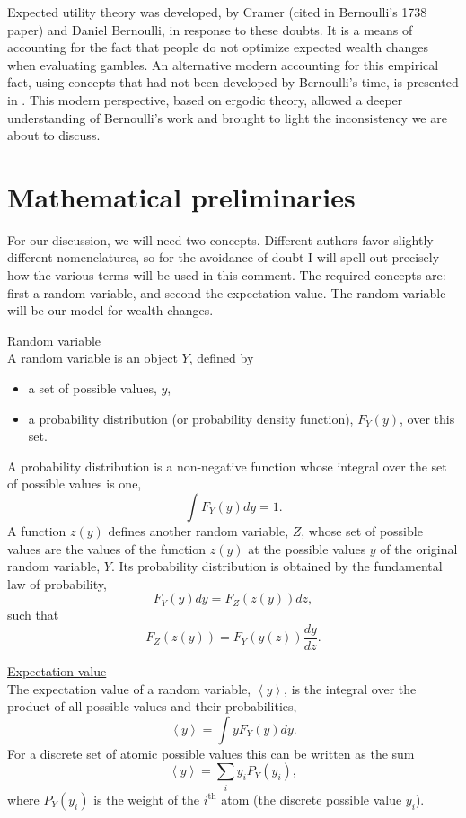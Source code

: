 \documentclass[dvips,draft]{ectaart}
\newcommand{\ave}[1]{\left\langle#1 \right\rangle}
\newcommand{\bi}{\begin{itemize}}
\newcommand{\ei}{\end{itemize}}
\newcommand{\be}{\begin{equation}}
\newcommand{\ee}{\end{equation}}
\begin{document}
Expected utility theory was developed, by Cramer (cited in Bernoulli's 1738 paper) and Daniel Bernoulli, in response to these doubts. It is a means of accounting for the fact that people do not optimize expected wealth changes when evaluating gambles. An alternative modern accounting for this empirical fact, using concepts that had not been developed by Bernoulli's time, is presented in \cite{PetersGell-Mann2016}. This modern perspective, based on ergodic theory, allowed a deeper understanding of Bernoulli's work and brought to light the inconsistency we are about to discuss.

\section{Mathematical preliminaries}
For our discussion, we will need two concepts. Different authors favor slightly different nomenclatures, so for the avoidance of doubt I will spell out precisely how the various terms will be used in this comment. The required concepts are: first a random variable, and second the expectation value. The random variable will be our model for wealth changes.

\underline{Random variable}\\
A random variable is an object $Y$, defined by 
\bi
\item
a set of possible values, $y$,
\item
a probability distribution (or probability density function), $F_Y(y)$, over this set.
\ei
A probability distribution is a non-negative function whose integral over the set of possible values is one,
\be
\int F_Y(y) dy =1.
\ee
A function $z(y)$ defines another random variable, $Z$, whose set of possible values are the values of the function $z(y)$ at the possible values $y$ of the original random variable, $Y$. Its probability distribution is obtained by the fundamental law of probability, 
\be
F_Y(y) dy = F_Z(z(y)) dz,
\ee
such that
\be
F_Z(z(y))=F_Y(y(z)) \frac{dy}{dz}.
\ee

\underline{Expectation value}\\
The expectation value of a random variable, $\ave{y}$, is the integral over the product of all possible values and their probabilities, 
\be
\ave{y}=\int y F_Y(y) dy.
\ee
For a discrete set of atomic possible values this can be written as the sum
\be
\ave{y}=\sum_i y_i P_Y(y_i),
\ee
where $P_Y(y_i)$ is the weight of the $i^{\text{th}}$ atom (the discrete possible value $y_i$).
\end{document}
